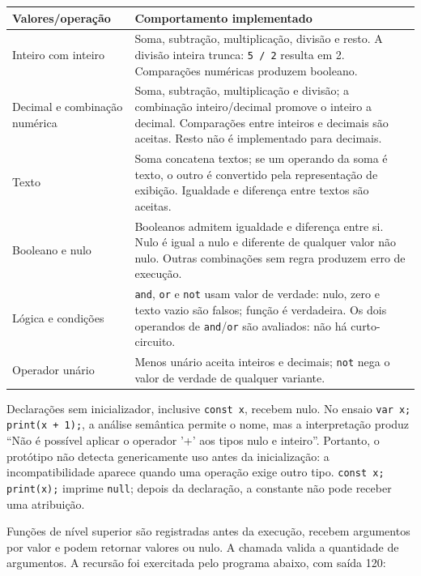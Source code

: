 \begin{quadro}[htb]
\centering
{}
\footnotesize
\begin{tabular}{|P{3.1cm}|P{10.0cm}|}
\hline
Valores/operação & Comportamento implementado \\
\hline\hline
Inteiro com inteiro & Soma, subtração, multiplicação, divisão e resto. A divisão inteira trunca: \texttt{5 / 2} resulta em 2. Comparações numéricas produzem booleano. \\
\hline
Decimal e combinação numérica & Soma, subtração, multiplicação e divisão; a combinação inteiro/decimal promove o inteiro a decimal. Comparações entre inteiros e decimais são aceitas. Resto não é implementado para decimais. \\
\hline
Texto & Soma concatena textos; se um operando da soma é texto, o outro é convertido pela representação de exibição. Igualdade e diferença entre textos são aceitas. \\
\hline
Booleano e nulo & Booleanos admitem igualdade e diferença entre si. Nulo é igual a nulo e diferente de qualquer valor não nulo. Outras combinações sem regra produzem erro de execução. \\
\hline
Lógica e condições & \texttt{and}, \texttt{or} e \texttt{not} usam valor de verdade: nulo, zero e texto vazio são falsos; função é verdadeira. Os dois operandos de \texttt{and}/\texttt{or} são avaliados: não há curto-circuito. \\
\hline
Operador unário & Menos unário aceita inteiros e decimais; \texttt{not} nega o valor de verdade de qualquer variante. \\
\hline
\end{tabular}
\vspace{0.2cm}
\end{quadro}
\FloatBarrier

Declarações sem inicializador, inclusive \texttt{const x}, recebem nulo.
No ensaio \texttt{var x; print(x + 1);}, a análise semântica permite o nome,
mas a interpretação produz ``Não é possível aplicar o operador '+' aos tipos
nulo e inteiro''. Portanto, o protótipo não detecta genericamente uso antes da
inicialização: a incompatibilidade aparece quando uma operação exige outro tipo.
\texttt{const x; print(x);} imprime \texttt{null}; depois da declaração,
a constante não pode receber uma atribuição.

Funções de nível superior são registradas antes da execução, recebem argumentos
por valor e podem retornar valores ou nulo. A chamada valida a quantidade de
argumentos. A recursão foi exercitada pelo programa abaixo, com saída 120:

